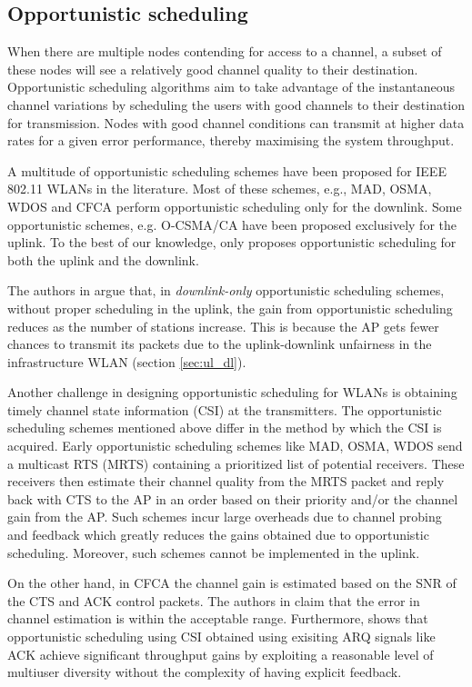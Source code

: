 \documentclass[10pt,conference]{IEEEtran}
\begin{document}
\subsection{Opportunistic scheduling}
When there are multiple nodes contending for access to a channel, a subset of these nodes will see a relatively good channel quality to their destination. 
Opportunistic scheduling algorithms aim to take advantage of the instantaneous channel variations by scheduling the users with good channels to their destination for transmission.
Nodes with good channel conditions can transmit at higher data rates for a given error performance, thereby maximising the system throughput.

A multitude of opportunistic scheduling schemes have been proposed for IEEE 802.11 WLANs in the literature.
Most of these schemes, e.g., MAD\cite{Ji04}, OSMA\cite{wangOSMA}, WDOS\cite{DBLP:conf/ifip6-8/HahmLK06} and CFCA\cite{Kim06:37} perform opportunistic scheduling only for the downlink.
Some opportunistic schemes, e.g. O-CSMA/CA\cite{cioffiuplink} have been proposed exclusively for the uplink.
To the best of our knowledge, only \cite{Yoo08} proposes opportunistic scheduling for both the uplink and the downlink.

   The authors in \cite{Yoo08} argue that, in \emph{downlink-only} opportunistic scheduling schemes, without proper scheduling in the uplink, the gain from opportunistic scheduling reduces as the number of stations increase. 
This is because the AP gets fewer chances to transmit its packets due to the uplink-downlink unfairness in the infrastructure WLAN (section \ref{sec:ul_dl}). 

Another challenge in designing opportunistic scheduling for WLANs is obtaining timely channel state information (CSI) at the transmitters.
The opportunistic scheduling schemes mentioned above differ in the method by which the CSI is acquired.
Early opportunistic scheduling schemes like MAD\cite{Ji04}, OSMA\cite{wangOSMA}, WDOS\cite{DBLP:conf/ifip6-8/HahmLK06} send a multicast RTS (MRTS)
containing a prioritized list of potential receivers.
These receivers then estimate their channel quality from the MRTS packet and reply back with CTS to the AP in an order based on their priority and/or the channel gain from the AP.
Such schemes incur large overheads due to channel probing and feedback which greatly reduces the gains obtained due to opportunistic scheduling.
Moreover, such schemes cannot be implemented in the uplink.
 
   On the other hand, in CFCA\cite{Kim06:37}  the channel gain is estimated based on the SNR of the CTS and ACK control packets.
The authors in \cite{Kim06:37} claim that the error in channel estimation is within the acceptable range.
Furthermore, \cite{DBLP:conf/vtc/DianatiT08} shows that opportunistic scheduling using CSI obtained using exisiting ARQ signals like ACK achieve significant throughput gains by 
exploiting a reasonable level of multiuser diversity without the complexity of having explicit feedback. 
\end{document}
